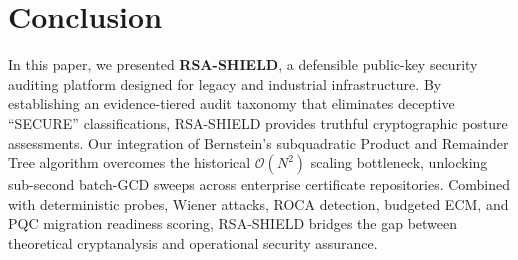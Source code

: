\documentclass[sigconf,nonacm]{acmart}
\begin{document}
\section{Conclusion}
In this paper, we presented \textbf{RSA-SHIELD}, a defensible public-key security auditing platform designed for legacy and industrial infrastructure. By establishing an evidence-tiered audit taxonomy that eliminates deceptive ``SECURE'' classifications, RSA-SHIELD provides truthful cryptographic posture assessments. Our integration of Bernstein's subquadratic Product and Remainder Tree algorithm overcomes the historical $\mathcal{O}(N^2)$ scaling bottleneck, unlocking sub-second batch-GCD sweeps across enterprise certificate repositories. Combined with deterministic probes, Wiener attacks, ROCA detection, budgeted ECM, and PQC migration readiness scoring, RSA-SHIELD bridges the gap between theoretical cryptanalysis and operational security assurance.



\end{document}
